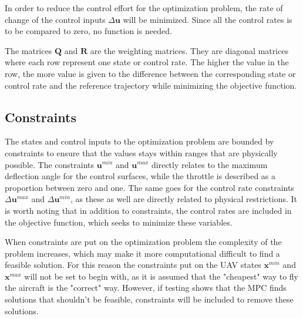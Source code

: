 In order to reduce the control effort for the optimization problem, the rate of change of the control inputs $\Delta\mathbf{u}$ will be minimized. Since all the control rates is to be compared to zero, no function is needed.

The matrices $\mathbf{Q}$ and $\mathbf{R}$ are the weighting matrices. They are diagonal matrices where each row represent one state or control rate. The higher the value in the row, the more value is given to the difference between the corresponding state or control rate and the reference trajectory while minimizing the objective function.


\subsection{Constraints}

The states and control inputs to the optimization problem are bounded by constraints to ensure that the values stays within ranges that are physically possible. The constraints $\mathbf{u}^{min}$ and $\mathbf{u}^{max}$ directly relates to the maximum deflection angle for the control surfaces, while the throttle is described as a proportion between zero and one. The same goes for the control rate constraints $\Delta \mathbf{u}^{max}$ and $\Delta \mathbf{u}^{min}$, as these as well are directly related to physical restrictions. It is worth noting that in addition to constraints, the control rates are included in the objective function, which seeks to minimize these variables.

When constraints are put on the optimization problem the complexity of the problem increases, which may make it more computational difficult to find a feasible solution. For this reason the constraints put on the UAV states $\mathbf{x}^{min}$ and $\mathbf{x}^{max}$ will not be set to begin with, as it is assumed that the "cheapest" way to fly the aircraft is the "correct" way. However, if testing shows that the MPC finds solutions that shouldn't be feasible, constraints will be included to remove these solutions.